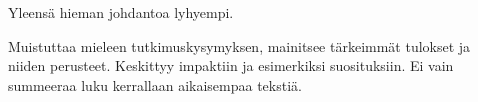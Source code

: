 \documentclass[finnish]{tktltiki2}
\theoremstyle{definition}
\theoremstyle{remark}
\begin{document}
Yleensä hieman johdantoa lyhyempi.

Muistuttaa mieleen tutkimuskysymyksen, mainitsee tärkeimmät tulokset ja niiden perusteet. Keskittyy impaktiin ja esimerkiksi suosituksiin. Ei vain summeeraa luku kerrallaan aikaisempaa tekstiä.



%
%
% 
%


%





% 
\end{document}

